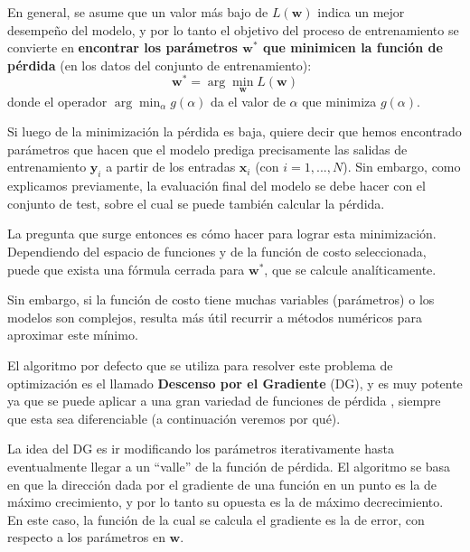 \documentclass[../../main.tex]{subfiles}
\begin{document}
En general, se asume que un valor más bajo de \(L(\bm{w})\) indica un mejor desempeño del
modelo, y por lo tanto el objetivo del proceso de entrenamiento se convierte en
\textbf{encontrar los parámetros \(\bm{w}^*\) que minimicen la función de pérdida}
(en los datos del conjunto de entrenamiento):
\[
\bm{w}^* = \arg\min_{\bm{w}} L(\bm{w})
\]
donde el operador \(\arg\min_{\alpha} g(\alpha)\) da el valor de \(\alpha\)
que minimiza \(g(\alpha)\).

Si luego de la minimización la pérdida es baja, quiere decir que hemos encontrado
parámetros que hacen que el modelo prediga precisamente las salidas de entrenamiento
\(\bm{y}_i\) a partir de los entradas \(\bm{x}_i\) (con \(i=1,...,N\)). Sin
embargo, como explicamos previamente, la evaluación final del modelo se debe hacer con el
conjunto de test, sobre el cual se puede también calcular la pérdida.

La pregunta que surge entonces es cómo hacer para lograr esta minimización. Dependiendo
del espacio de funciones y de la función de costo seleccionada, puede que exista una
fórmula cerrada para \(\bm{w}^*\), que se calcule analíticamente.

Sin embargo, si la función de costo tiene muchas variables (parámetros) o los modelos son
complejos, resulta más útil recurrir a métodos numéricos para aproximar este mínimo.

El algoritmo por defecto que se utiliza para resolver este problema de optimización es el
llamado \textbf{Descenso por el Gradiente} (DG), y es muy potente ya que se puede aplicar a
una gran variedad de funciones de pérdida \cite{ai-a-modern-approach}, siempre que esta
sea diferenciable (a continuación veremos por qué).

La idea del DG es ir modificando los parámetros iterativamente hasta eventualmente llegar
a un ``valle'' de la función de pérdida. El algoritmo se basa en que la dirección dada por
el gradiente\footnotemark{} de una función en un punto es la de máximo crecimiento, y por
lo tanto su opuesta es la de máximo decrecimiento. En este caso, la función de la cual se
calcula el gradiente es la de error, con respecto a los parámetros en \(\bm{w}\).
\end{document}
